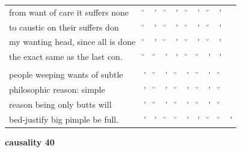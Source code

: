 \documentclass[12pt, landscape]{article}
\begin{document}
\begin{center}
\begin{tabularx}{\textwidth}{
>{\lefting\arraybackslash}X
c
c
c
c
c
c
c
c
c
}

from want of care it suffers none & \u{} & \'{} & \u{} & \'{} & \u{} & \'{} & \u{} & \'{} & \\
to  caustic on their suffers don & \u{} & \'{} & \u{} & \'{} & \u{} & \'{} & \u{} & \'{} & \\
my wanting head, since all is done & \u{} & \'{} & \u{} & \'{} & \u{} & \'{} & \u{} & \'{} & \\
the exact same as the last con. & \u{} & \u{} & \'{} & \'{} & \u{} & \u{} & \'{} & \'{} & \\
 & & & & & & & & \\
people weeping wants of subtle & \'{} & \u{} & \'{} & \u{} & \'{} & \u{} & \'{} & \u{} & \\
philosophic reason: simple & \'{} & \u{} & \'{} & \u{} & \'{} & \u{} & \'{} & \u{} & \\
reason being only butts will & \'{} & \u{} & \'{} & \u{} & \'{} & \u{} & \'{} & \u{} & \\
bed-justify big pimple be full. & \'{} & \'{} & \u{} & \u{} & \'{} & \'{} & \u{} & \u{} & \'{} \\

\end{tabularx}
\end{center}

\vspace*{\fill}

\newpage

\vspace*{\fill}

\noindent \textbf{causality 40}
\noindent \hfill \par
\end{document}
